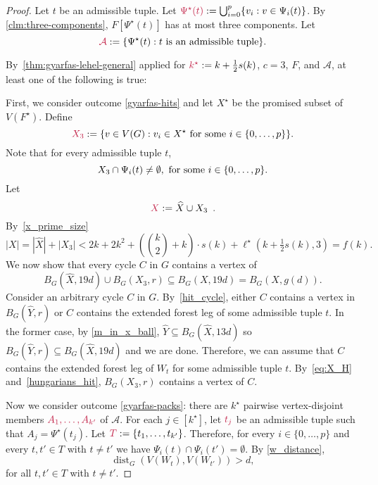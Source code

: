 \documentclass{patmorin}
\DeclareMathOperator{\dist}{dist}
\DeclarePairedDelimiter\set{\{}{\}}
\begin{document}
\begin{proof}
  Let $t$ be an admissible tuple. Let $\mathdefin{\Psi^\star(t)}:=\bigcup_{i=0}^p \{v_i:v\in \Psi_i(t)\}$. By \cref{clm:three-components}, $F[\Psi^\star(t)]$ has at most three components. Let
  \[
    \mathdefin{\mathcal{A}}:=\{\Psi^\star(t):\text{$t$ is an admissible tuple}\}.
  \]

  By~\cref{thm:gyarfas-lehel-general} applied for $\mathdefin{k^\star}:=k+\tfrac{1}{2}s(k)$, $c=3$, $F$, and $\mathcal{A}$, at least one of the following is true:

  First, we consider outcome \cref{gyarfas-hits} and let $X^\star$ be the promised subset of $V(F^\star)$. Define
  \[
    \mathdefin{X_3}:=\set{v\in V(G):v_i\in X^\star \textrm{ for some $i\in\set{0,\ldots,p}$}}.
  \]
  Note that for every admissible tuple $t$,
  \begin{equation}\label{eq:X_H}
    X_3 \cap \Psi_i(t) \neq\emptyset,\ \textrm{for some $i\in\set{0,\ldots,p}$.}
  \end{equation}
  Let
  \[
  \mathdefin{X}:=\widehat{X} \cup X_3 \enspace .
  \]
  By~\eqref{x_prime_size}
  \[
    |X| = |\widehat{X}| + |X_3| < \textstyle 2k + 2k^2 + (\binom{k}{2}+k)\cdot s(k) +  \ell^\star(k+\tfrac{1}{2}s(k),3) = f(k).
  \]
  We now show that every cycle $C$ in $G$ contains a vertex of
  \[
    B_G(\widehat{X},19d)\cup B_G(X_3,r)\subseteq B_G(X,19d) = B_G(X,g(d)).
  \]
  Consider an arbitrary cycle $C$ in $G$. By~\cref{hit_cycle}, either $C$ contains a vertex in $B_G(\widehat{Y},r)$ or $C$ contains the extended forest leg of some admissible tuple $t$. In the former case, by \eqref{m_in_x_ball}, $\widehat{Y}\subseteq B_G(\widehat{X},13d)$ so $B_G(\widehat{Y},r)\subseteq B_G(\widehat{X},19d)$ and we are done. Therefore, we can assume that $C$ contains the extended forest leg of $W_t$ for some admissible tuple $t$. By~\eqref{eq:X_H} and~\cref{hungarians_hit}, $B_G(X_3,r)$ contains a vertex of $C$.

  Now we consider outcome \cref{gyarfas-packs}: there are $k^\star$ pairwise vertex-disjoint members $\mathdefin{A_1,\ldots,A_{k'}}$ of $\mathcal{A}$. For each $j\in[k^\star]$, let $\mathdefin{t_j}$ be an admissible tuple such that $A_j = \Psi^\star(t_j)$. Let $\mathdefin{T}:=\set{t_1,\ldots, t_{k'}}$. Therefore, for every $i\in\{0,\ldots,p\}$ and every $t,t'\in T$ with $t\neq t'$ we have $\Psi_i(t) \cap \Psi_i(t') = \emptyset$. By \cref{w_distance},
  \begin{equation}\label{eq:Wt-and-Wt-far-apart}
    \dist_G(V(W_{t}), V(W_{t'}))> d,
  \end{equation}
  for all $t,t'\in T$ with $t\neq t'$.


\end{proof}
\end{document}
